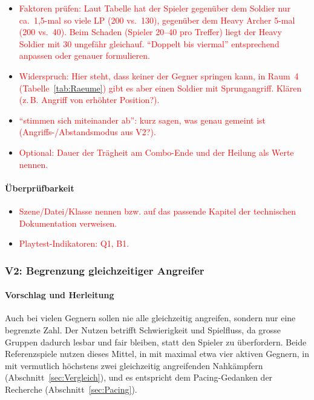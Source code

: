 \documentclass[../Main.tex]{subfiles}
\begin{document}
\begin{itemize}[leftmargin=1.5cm]
    \item \textcolor{red}{Faktoren prüfen: Laut Tabelle hat der Spieler gegenüber dem Soldier nur ca.\ 1,5-mal so viele LP (200 vs.\ 130), gegenüber dem Heavy Archer 5-mal (200 vs.\ 40). Beim Schaden (Spieler 20--40 pro Treffer) liegt der Heavy Soldier mit 30 ungefähr gleichauf. \enquote{Doppelt bis viermal} entsprechend anpassen oder genauer formulieren.}
    \item \textcolor{red}{Widerspruch: Hier steht, dass keiner der Gegner springen kann, in Raum~4 (Tabelle~\ref{tab:Raeume}) gibt es aber einen Soldier mit Sprungangriff. Klären (z.\,B. Angriff von erhöhter Position?).}
    \item \textcolor{red}{\enquote{stimmen sich miteinander ab}: kurz sagen, was genau gemeint ist (Angriffs-/Abstandsmodus aus V2?).}
    \item \textcolor{red}{Optional: Dauer der Trägheit am Combo-Ende und der Heilung als Werte nennen.}
\end{itemize}

\paragraph{Überprüfbarkeit}
\begin{itemize}[leftmargin=1.5cm]
    \item \textcolor{red}{Szene/Datei/Klasse nennen bzw. auf das passende Kapitel der technischen Dokumentation verweisen.}
    \item \textcolor{red}{Playtest-Indikatoren: Q1, B1.}
\end{itemize}

\subsubsection{V2: Begrenzung gleichzeitiger Angreifer} \label{sec:V2}

\paragraph{Vorschlag und Herleitung}
Auch bei vielen Gegnern sollen nie alle gleichzeitig angreifen, sondern nur eine begrenzte Zahl. Der Nutzen betrifft Schwierigkeit und Spielfluss, da grosse Gruppen dadurch lesbar und fair bleiben, statt den Spieler zu überfordern. Beide Referenzspiele nutzen dieses Mittel, in  mit maximal etwa vier aktiven Gegnern, in  mit vermutlich höchstens zwei gleichzeitig angreifenden Nahkämpfern (Abschnitt~\ref{sec:Vergleich}), und es entspricht dem Pacing-Gedanken der Recherche (Abschnitt~\ref{sec:Pacing}).
\end{document}
